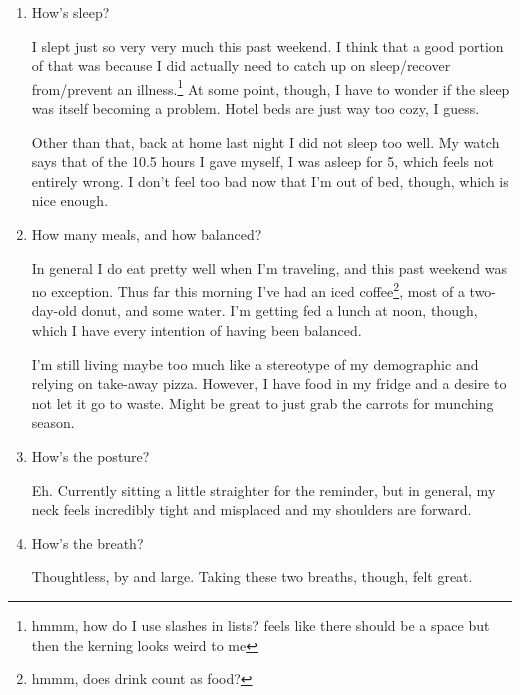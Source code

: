\documentclass[12pt]{article}
\renewcommand{\,}{\textsuperscript{,}}
\begin{document}
\begin{enumerate}
Outside of that, I've been pretty blase.  
I know that I say that I can use travel days as a place to get a lot of work done, but I struggled with that this week.  
I think that much of that comes down to how tired I was/am, and the rest comes from the general sense of aimlessness I have right now.\footnote{which would be a good thing to folly on (hmmm folly on is a terrible phrase, think of something better)}

\item How's sleep?

I slept just so very very much this past weekend.  
I think that a good portion of that was because I did actually need to catch up on sleep/recover from/prevent an illness.\footnote{hmmm, how do I use slashes in lists? feels like there should be a space but then the kerning looks weird to me}  
At some point, though, I have to wonder if the sleep was itself becoming a problem.  
Hotel beds are just way too cozy, I guess.

Other than that, back at home last night I did not sleep too well.  
My watch says that of the 10.5 hours I gave myself, I was asleep for 5, which feels not entirely wrong.  
I don't feel too bad now that I'm out of bed, though, which is nice enough.

\item How many meals, and how balanced?

In general I do eat pretty well when I'm traveling, and this past weekend was no exception.  
Thus far this morning I've had an iced coffee\footnote{hmmm, does drink count as food?}, most of a two-day-old donut, and some water.  
I'm getting fed a lunch at noon, though, which I have every intention of having been balanced.

I'm still living maybe too much like a stereotype of my demographic and relying on take-away pizza.  
However, I have food in my fridge and a desire to not let it go to waste.  
Might be great to just grab the carrots for munching season.

\item How's the posture?

Eh.  
Currently sitting a little straighter for the reminder, but in general, my neck feels incredibly tight and misplaced and my shoulders are forward.

\item How's the breath?

Thoughtless, by and large.  
Taking these two breaths, though, felt great.


\end{enumerate}
\end{document}
